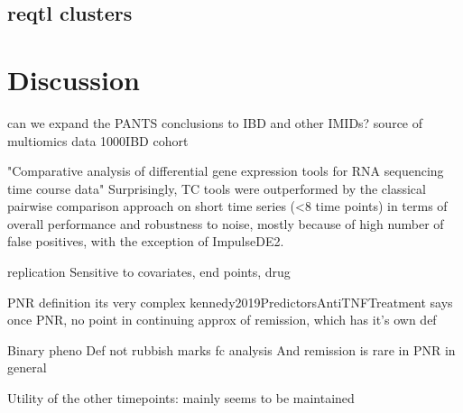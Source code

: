 \begin{outline}

\subsection{reqtl clusters}






\section{Discussion}


%

\1 can we expand the PANTS conclusions to IBD and other IMIDs?
\1 source of multiomics data 1000IBD cohort \autocite{imhann20191000IBDProjectMultiomics}

"Comparative analysis of differential gene expression tools for RNA sequencing time course data"
Surprisingly, TC tools were outperformed by the classical pairwise comparison approach on short time series (<8 time points) in terms of overall performance and robustness to noise, mostly because of high number of false positives, with the exception of ImpulseDE2.

replication
    Sensitive to covariates, end points, drug

PNR definition
    its very complex
    kennedy2019PredictorsAntiTNFTreatment says once PNR, no point in continuing
        approx of remission, which has it's own def

    Binary pheno Def not rubbish
        marks fc analysis
        And remission is rare in PNR in general

Utility of the other timepoints:
    mainly seems to be maintained


\end{outline}
